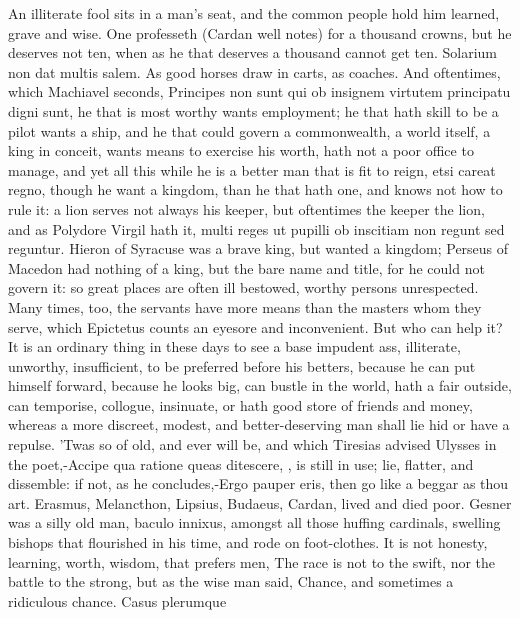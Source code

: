 {An illiterate fool sits in a man's seat, and the common people hold him
learned, grave and wise. One professeth (Cardan well notes) for a
thousand crowns, but he deserves not ten, when as he that deserves a
thousand cannot get ten. Solarium non dat multis salem. As good horses
draw in carts, as coaches. And oftentimes, which Machiavel seconds,
 Principes non sunt qui ob insignem virtutem principatu digni
sunt, he that is most worthy wants employment; he that hath skill to be
a pilot wants a ship, and he that could govern a commonwealth, a world
itself, a king in conceit, wants means to exercise his worth, hath not
a poor office to manage, and yet all this while he is a better man that
is fit to reign, etsi careat regno, though he want a kingdom,
than he that hath one, and knows not how to rule it: a lion
serves not always his keeper, but oftentimes the keeper the lion, and
as Polydore Virgil hath it, multi reges ut pupilli ob inscitiam
non regunt sed reguntur. Hieron of Syracuse was a brave king, but
wanted a kingdom; Perseus of Macedon had nothing of a king, but the
bare name and title, for he could not govern it: so great places are
often ill bestowed, worthy persons unrespected. Many times, too, the
servants have more means than the masters whom they serve, which
Epictetus counts an eyesore and inconvenient. But who can help
it? It is an ordinary thing in these days to see a base impudent ass,
illiterate, unworthy, insufficient, to be preferred before his betters,
because he can put himself forward, because he looks big, can bustle in
the world, hath a fair outside, can temporise, collogue, insinuate, or
hath good store of friends and money, whereas a more discreet, modest,
and better-deserving man shall lie hid or have a repulse. 'Twas so of
old, and ever will be, and which Tiresias advised Ulysses in the 
poet,-Accipe qua ratione queas ditescere, \etc{}, is still in use; lie,
flatter, and dissemble: if not, as he concludes,-Ergo pauper eris, then
go like a beggar as thou art. Erasmus, Melancthon, Lipsius, Budaeus,
Cardan, lived and died poor. Gesner was a silly old man, baculo
innixus, amongst all those huffing cardinals, swelling bishops that
flourished in his time, and rode on foot-clothes. It is not honesty,
learning, worth, wisdom, that prefers men, The race is not to the
swift, nor the battle to the strong, but as the wise man said,
Chance, and sometimes a ridiculous chance. Casus plerumque
}
